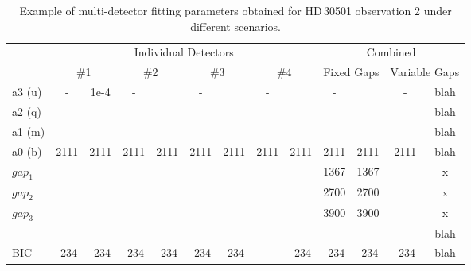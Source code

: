 \begin{table}
    \small
    \caption[Example of multi-detector fitting parameters.]{Example of multi-detector fitting parameters obtained for HD\,30501 observation 2 under different scenarios.}
    \begin{tabular}{|l|c|c|c|c|c|c|c|c|c|c|c|c|}
    	\toprule
    	  &    \multicolumn{8}{c|}{Individual Detectors}    &    \multicolumn{4}{c|}{Combined}    \\
    	  & \multicolumn{2}{c|}{\#1} & \multicolumn{2}{c|}{\#2} & \multicolumn{2}{c|}{\#3} & \multicolumn{2}{c|}{\#4} & \multicolumn{2}{c|}{Fixed Gaps} & \multicolumn{2}{c|}{Variable Gaps} \\ \midrule
    	a3 (u)    &  -   &    1e-4    &  -   &    &  -   &    &  -   &    &  -   &    &  -   &    blah    \\
    	a2 (q)    &      &    &    &    &    &    &    &    &    &    &    &    blah    \\
    	a1 (m)   &      &    &    &    &    &    &    &    &    &    &    &    blah    \\
    	a0 (b)    & 2111 &    2111    & 2111 &    2111    & 2111 &    2111    & 2111 &    2111    & 2111 &    2111    & 2111 & blah \\
        \(gap_{1}\) &      &    &    &    &    &    &    &    &   1367  & 1367   &   & x\\
        \(gap_{2}\) &      &    &    &    &    &    &    &    &  2700   &  2700  &   & x\\
        \(gap_{3}\) &      &    &    &    &    &    &    &    &   3900 &   3900 &    & x\\
    	\textchisquared{} &    &    &    &    &    &    &    &    &    &    &    &    blah    \\
    	BIC        & -234      &    -234    & -234 &    -234    & -234 &    -234    &    &    -234    & -234 &    -234    & -234 &    blah  \\
        \bottomrule
    \end{tabular}\label{tab:example_calibration_parametres}
\end{table}


